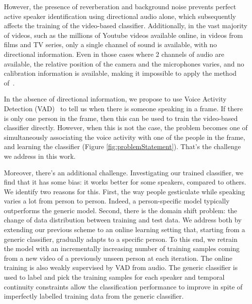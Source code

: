 \documentclass[runningheads]{llncs}
\begin{document}
However, the presence of reverberation and background noise prevents perfect active speaker identification using directional audio alone, which subsequently affects the training of the video-based classifier.
%
Additionally, in the vast majority of videos, such as the millions of Youtube videos available online, in videos from films and TV series, only a single channel of sound is available, with no directional information. Even in those cases where 2 channels of audio are available,  the relative position of the camera and the microphones varies, and no calibration information is available, making it impossible to apply the method of~\cite{Chakravarty15}.

In the absence of directional information, we propose to use Voice Activity Detection (VAD)~\cite{Germain13} to tell us when there is someone speaking in a frame. If there is only one person in the frame, then this can be used to train the video-based classifier directly. However, when this is not the case, the problem becomes one of simultaneously associating the voice activity with one of the people in the frame, and learning the classifier (Figure \ref{fig:problemStatement}). That's the challenge we address in this work.

Moreover, there's an additional challenge. Investigating our trained classifier, we find that it has some bias: it works better for some speakers, compared to others. We identify two reasons for this. First, the way people gesticulate while speaking varies a lot from person to person. Indeed, a person-specific model typically
outperforms the generic model. 
Second, there is the domain shift problem: the change of data distribution between training and test data. We address both by extending our previous scheme to an online learning setting that, starting from a generic classifier, gradually adapts to a specific person. To this end, we retrain the model with an incrementally increasing number of training samples coming from a new video of a previously unseen person at each iteration. The online training is also weakly supervised by VAD from audio. The generic classifier is used to label and pick the training samples for each speaker and temporal continuity constraints allow the classification performance to improve in spite of imperfectly labelled training data from the generic classifier.

\end{document}
